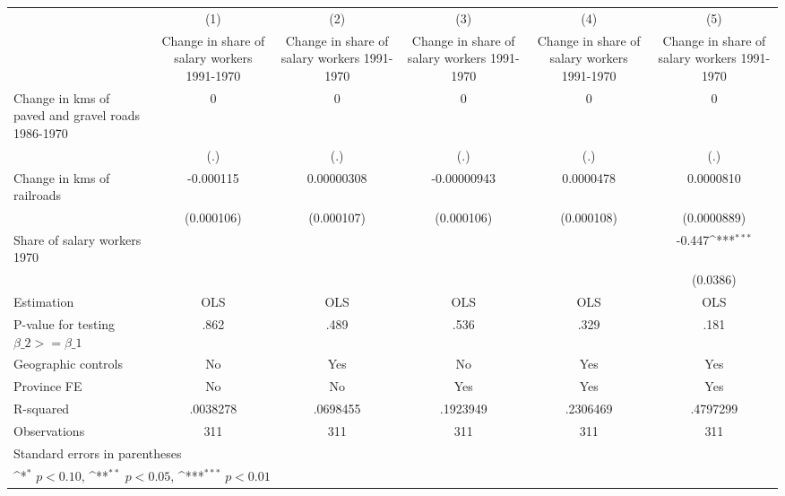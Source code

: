 {
\def\sym#1{\ifmmode^{#1}\else\(^{#1}\)\fi}
\begin{tabular}{l*{5}{c}}
\hline\hline
                    &\multicolumn{1}{c}{(1)}&\multicolumn{1}{c}{(2)}&\multicolumn{1}{c}{(3)}&\multicolumn{1}{c}{(4)}&\multicolumn{1}{c}{(5)}\\
                    &\multicolumn{1}{c}{Change in share of salary workers 1991-1970}&\multicolumn{1}{c}{Change in share of salary workers 1991-1970}&\multicolumn{1}{c}{Change in share of salary workers 1991-1970}&\multicolumn{1}{c}{Change in share of salary workers 1991-1970}&\multicolumn{1}{c}{Change in share of salary workers 1991-1970}\\
\hline
Change in kms of paved and gravel roads 1986-1970&           0         &           0         &           0         &           0         &           0         \\
                    &         (.)         &         (.)         &         (.)         &         (.)         &         (.)         \\
[1em]
Change in kms of railroads&   -0.000115         &  0.00000308         & -0.00000943         &   0.0000478         &   0.0000810         \\
                    &  (0.000106)         &  (0.000107)         &  (0.000106)         &  (0.000108)         & (0.0000889)         \\
[1em]
Share of salary workers 1970&                     &                     &                     &                     &      -0.447\sym{***}\\
                    &                     &                     &                     &                     &    (0.0386)         \\
\hline
Estimation          &         OLS         &         OLS         &         OLS         &         OLS         &         OLS         \\
P-value for testing $\beta\_2 >= \beta\_1$&        .862         &        .489         &        .536         &        .329         &        .181         \\
Geographic controls &          No         &         Yes         &          No         &         Yes         &         Yes         \\
Province FE         &          No         &          No         &         Yes         &         Yes         &         Yes         \\
R-squared           &    .0038278         &    .0698455         &    .1923949         &    .2306469         &    .4797299         \\
Observations        &         311         &         311         &         311         &         311         &         311         \\
\hline\hline
\multicolumn{6}{l}{\footnotesize Standard errors in parentheses}\\
\multicolumn{6}{l}{\footnotesize \sym{*} \(p<0.10\), \sym{**} \(p<0.05\), \sym{***} \(p<0.01\)}\\
\end{tabular}
}
